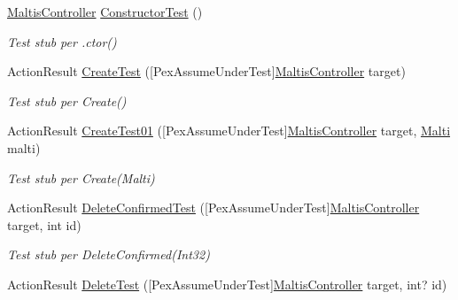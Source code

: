 \begin{DoxyCompactItemize}
\item 
\mbox{\hyperlink{class_brew_day2_1_1_controllers_1_1_maltis_controller}{Maltis\+Controller}} \mbox{\hyperlink{class_brew_day2_1_1_controllers_1_1_tests_1_1_maltis_controller_test_a5797ffb988bdd00e55d2a9cbab138907}{Constructor\+Test}} ()
\begin{DoxyCompactList}\small\item\em Test stub per .ctor()\end{DoxyCompactList}\item 
Action\+Result \mbox{\hyperlink{class_brew_day2_1_1_controllers_1_1_tests_1_1_maltis_controller_test_a37df510a132bb515c854715cb6d90bd0}{Create\+Test}} (\mbox{[}Pex\+Assume\+Under\+Test\mbox{]}\mbox{\hyperlink{class_brew_day2_1_1_controllers_1_1_maltis_controller}{Maltis\+Controller}} target)
\begin{DoxyCompactList}\small\item\em Test stub per Create()\end{DoxyCompactList}\item 
Action\+Result \mbox{\hyperlink{class_brew_day2_1_1_controllers_1_1_tests_1_1_maltis_controller_test_a3dcc4b88f646570b3016aa6ccfd0d8c8}{Create\+Test01}} (\mbox{[}Pex\+Assume\+Under\+Test\mbox{]}\mbox{\hyperlink{class_brew_day2_1_1_controllers_1_1_maltis_controller}{Maltis\+Controller}} target, \mbox{\hyperlink{class_brew_day2_1_1_models_1_1_malti}{Malti}} malti)
\begin{DoxyCompactList}\small\item\em Test stub per Create(\+Malti)\end{DoxyCompactList}\item 
Action\+Result \mbox{\hyperlink{class_brew_day2_1_1_controllers_1_1_tests_1_1_maltis_controller_test_ae40e96113a844d3558f1ffd4913f8659}{Delete\+Confirmed\+Test}} (\mbox{[}Pex\+Assume\+Under\+Test\mbox{]}\mbox{\hyperlink{class_brew_day2_1_1_controllers_1_1_maltis_controller}{Maltis\+Controller}} target, int id)
\begin{DoxyCompactList}\small\item\em Test stub per Delete\+Confirmed(\+Int32)\end{DoxyCompactList}\item 
Action\+Result \mbox{\hyperlink{class_brew_day2_1_1_controllers_1_1_tests_1_1_maltis_controller_test_ae61cc9d4f3808ae98f9261f2e5609325}{Delete\+Test}} (\mbox{[}Pex\+Assume\+Under\+Test\mbox{]}\mbox{\hyperlink{class_brew_day2_1_1_controllers_1_1_maltis_controller}{Maltis\+Controller}} target, int? id)

\end{DoxyCompactItemize}
